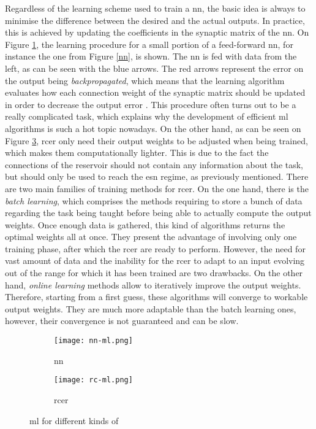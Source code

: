 Regardless of the learning scheme used to train a \gls{nn}, the basic idea is always to minimise the difference between the desired and the actual outputs. In practice, this is achieved by updating the coefficients in the synaptic matrix of the \gls{nn}. On Figure \ref{nn-ml}, the learning procedure for a small portion of a feed-forward \gls{nn}, for instance the one from Figure \ref{nn}, is shown. The \gls{nn} is fed with data from the left, as can be seen with the blue arrows. The red arrows represent the error on the output being \emph{backpropagated}, which means that the learning algorithm evaluates how each connection weight of the synaptic matrix should be updated in order to decrease the output error \cite[p.241]{bishop2006pattern}. This procedure often turns out to be a really complicated task, which explains why the development of efficient \gls{ml} algorithms is such a hot topic nowadays. On the other hand, as can be seen on Figure \ref{rc-ml}, \gls{rcer} only need their output weights to be adjusted when being trained, which makes them computationally lighter. This is due to the fact the connections of the reservoir should not contain any information about the task, but should only be used to reach the \gls{esn} regime, as previously mentioned. There are two main families of training methods for \gls{rcer}. On the one hand, there is the \textit{batch learning}, which comprises the methods requiring to store a bunch of data regarding the task being taught before being able to actually compute the output weights. Once enough data is gathered, this kind of algorithms returns the optimal weights all at once. They present the advantage of involving only one training phase, after which the \gls{rcer} are ready to perform. However, the need for vast amount of data and the inability for the \gls{rcer} to adapt to an input evolving out of the range for which it has been trained are two drawbacks. On the other hand, \textit{online learning} methods allow to iteratively improve the output weights. Therefore, starting from a first guess, these algorithms will converge to workable output weights. They are much more adaptable than the batch learning ones, however, their convergence is not guaranteed and can be slow.

\begin{figure}[h]
	\centering
	\begin{subfigure}{.5\textwidth}
		\centering
		\texttt{[image: nn-ml.png]}
		\caption{\acrlong{nn} \cite[p.244]{bishop2006pattern}}
		\label{nn-ml}
	\end{subfigure}%
	\begin{subfigure}{.5\textwidth}
		\centering
		\texttt{[image: rc-ml.png]}
		\caption{\acrlong{rcer} \cite{Goudarzi2014ACS}}
		\label{rc-ml}
	\end{subfigure}
	\caption{\acrlong{ml} for different kinds of }
\end{figure}


